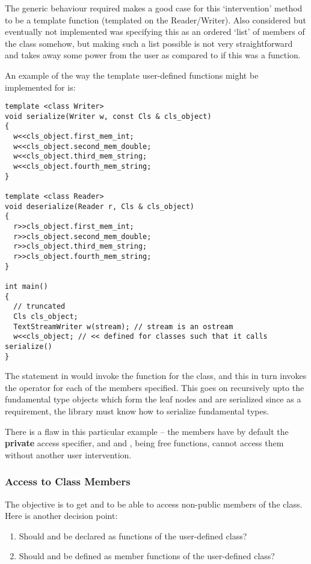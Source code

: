 \documentclass{article}
\begin{document}
The generic behaviour required makes a good case for this
`intervention' method to be a template function (templated on the
Reader/Writer). Also considered but eventually not implemented was
specifying this as an ordered `list' of members of the class somehow,
but making such a list possible is not very straightforward and takes
away some power from the user as compared to if this was a function.

An example of the way the template user-defined functions might be
implemented for  is:
\begin{lstlisting}
template <class Writer>
void serialize(Writer w, const Cls & cls_object)
{
  w<<cls_object.first_mem_int;
  w<<cls_object.second_mem_double;
  w<<cls_object.third_mem_string;
  w<<cls_object.fourth_mem_string;
}

template <class Reader>
void deserialize(Reader r, Cls & cls_object)
{
  r>>cls_object.first_mem_int;
  r>>cls_object.second_mem_double;
  r>>cls_object.third_mem_string;
  r>>cls_object.fourth_mem_string;
}

int main()
{
  // truncated
  Cls cls_object;
  TextStreamWriter w(stream); // stream is an ostream
  w<<cls_object; // << defined for classes such that it calls serialize()
}
\end{lstlisting}

The  statement in  would invoke the
 function for the class, and this in turn invokes the
\code{<<} operator for each of the members specified. This goes on
recursively upto the fundamental type objects which form the leaf
nodes and are serialized since as a requirement, the library must know
how to serialize fundamental types.

There is a flaw in this particular example -- the members have by
default the \textbf{private} access specifier, and 
and , being free functions, cannot access them
without another user intervention.

\subsubsection{Access to Class Members}
The objective is to get  and  to be
able to access non-public members of the class. Here is another
decision point:
\begin{enumerate}
\item Should  and  be declared as
   functions of the user-defined class?
\item Should  and  be defined as
  member functions of the user-defined class?
\end{enumerate}
\end{document}
